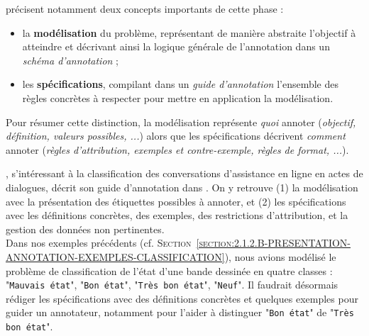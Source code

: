 			\cite{pustejovsky-stubbs:2012:natural-language-annotation} précisent notamment deux concepts importants de cette phase :
			\begin{itemize}
				\item la \textbf{modélisation} du problème, représentant de manière abstraite l'objectif à atteindre et décrivant ainsi la logique générale de l'annotation dans un \textit{schéma d'annotation} ;
				\item les \textbf{spécifications}, compilant dans un \textit{guide d'annotation} l'ensemble des règles concrètes à respecter pour mettre en application la modélisation.
			\end{itemize}
			Pour résumer cette distinction, la modélisation représente \textit{quoi} annoter (\textit{objectif, définition, valeurs possibles, ...}) alors que les spécifications décrivent \textit{comment} annoter (\textit{règles d'attribution, exemples et contre-exemple, règles de format, ...}).
			\begin{leftBarExamples}
				\cite{perrotin-etal:2018:annotation-actes-dialogue}, s'intéressant à la classification des conversations d'assistance en ligne en actes de dialogues, décrit son guide d'annotation dans \cite{asher-etal:2017:manuel-annotation-actes}.
				On y retrouve (1) la modélisation avec la présentation des étiquettes possibles à annoter, et (2) les spécifications avec les définitions concrètes, des exemples, des restrictions d'attribution, et la gestion des données non pertinentes. \\
				Dans nos exemples précédents (cf. \textsc{Section~\ref{section:2.1.2.B-PRESENTATION-ANNOTATION-EXEMPLES-CLASSIFICATION}}), nous avions modélisé le problème de classification de l'état d'une bande dessinée en quatre classes : "\texttt{Mauvais état}", "\texttt{Bon état}", "\texttt{Très bon état}", "\texttt{Neuf}".
				Il faudrait désormais rédiger les spécifications avec des définitions concrètes et quelques exemples  pour guider un annotateur, notamment pour l'aider à distinguer "\texttt{Bon état}" de "\texttt{Très bon état}".
			\end{leftBarExamples}
			
